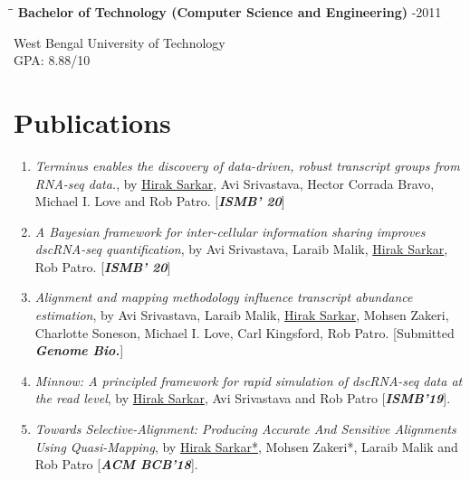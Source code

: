 \documentclass{res}
\begin{document}
\begin{resume}
\vspace{-0.1in}	
\begin{tabbing}
\hspace{2.3in}\= \hspace{2.6in}\= \kill %
{\bf Bachelor of Technology (Computer Science and Engineering)}  \>     -2011
\end{tabbing}  \vspace{-20pt}      %
West Bengal University of Technology     \\       
GPA: 8.88/10      \\   

\vspace{-0.9cm}
\section{Publications}
\begin{enumerate}

\item {\it Terminus enables the discovery of data-driven, robust transcript groups from RNA-seq data.}, by \underline{Hirak Sarkar}, Avi Srivastava, Hector Corrada Bravo, Michael I. Love and Rob Patro. [\textit{\textbf{ISMB' 20}}]

\item {\it A Bayesian framework for inter-cellular information sharing improves dscRNA-seq quantification}, by Avi Srivastava, Laraib Malik, \underline{Hirak Sarkar}, Rob Patro. [\textit{\textbf{ISMB' 20}}]

\item {\it Alignment and mapping methodology influence transcript abundance estimation}, by Avi Srivastava, Laraib Malik, \underline{Hirak Sarkar}, Mohsen Zakeri, Charlotte Soneson, Michael I. Love, Carl Kingsford, Rob Patro. [Submitted  \textit{\textbf{Genome Bio.}}]

\item {\it Minnow: A principled framework for rapid simulation of dscRNA-seq data at the read level}, by \underline{Hirak Sarkar}, Avi Srivastava and Rob Patro [\textit{\textbf{ISMB'19}}]. 

\item {\it Towards Selective-Alignment: Producing Accurate And Sensitive Alignments Using Quasi-Mapping}, by \underline{Hirak Sarkar*}, Mohsen Zakeri*, Laraib Malik and Rob Patro [\textit{\textbf{ACM BCB'18}}]. 


\end{enumerate}
\end{resume}
\end{document}
